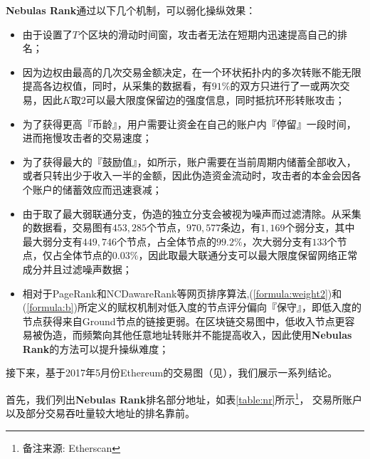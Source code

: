 \textbf{Nebulas Rank}通过以下几个机制，可以弱化操纵效果：
\begin{itemize}
	\item 由于设置了$T$个区块的滑动时间窗，攻击者无法在短期内迅速提高自己的排名；
	\item 因为边权由最高的几次交易金额决定，在一个环状拓扑内的多次转账不能无限提高各边权值，同时，从采集的数据看，有$91\%$的双方只进行了一或两次交易，因此$K$取$2$可以最大限度保留边的强度信息，同时抵抗环形转账攻击；
	\item 为了获得更高『币龄』，用户需要让资金在自己的账户内『停留』一段时间，进而拖慢攻击者的交易速度；
	\item 为了获得最大的『鼓励值』，如所示，账户需要在当前周期内储蓄全部收入，或者只转出少于收入一半的金额，因此伪造资金流动时，攻击者的本金会因各个账户的储蓄效应而迅速衰减；
	\item 由于取了最大弱联通分支，伪造的独立分支会被视为噪声而过滤清除。从采集的数据看，交易图有$453,285$个节点，$970,577$条边，有$1,169$个弱分支，其中最大弱分支有$449,746$个节点，占全体节点的$99.2\%$，次大弱分支有$133$个节点，仅占全体节点的$0.03\%$，因此取最大联通分支可以最大限度保留网络正常成分并且过滤噪声数据；
	\item 相对于PageRank和NCDawareRank\cite{Nikolakopoulos2013}等网页排序算法,(\ref{formula:weight2})和(\ref{formula:b})所定义的赋权机制对低入度的节点评分偏向『保守』，即低入度的节点获得来自Ground节点的链接更弱。在区块链交易图中，低收入节点更容易被伪造，而频繁向其他任意地址转账并不能提高收入，因此使用\textbf{Nebulas Rank}的方法可以提升操纵难度；
\end{itemize}

接下来，基于2017年5月份Ethereum的交易图（见），我们展示一系列结论。

首先，我们列出\textbf{Nebulas Rank}排名部分地址，如表\ref{table:nr}所示\footnote{备注来源: Etherscan\cite{etherscan}}， 交易所账户以及部分交易吞吐量较大地址的排名靠前。

\newpage

